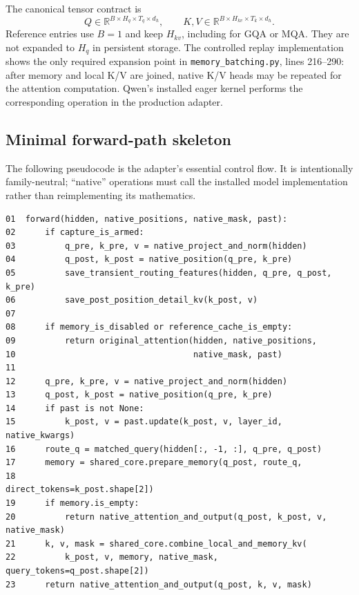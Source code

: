 \documentclass[11pt]{article}
\begin{document}
The canonical tensor contract is
\begin{equation}
Q\in\mathbb{R}^{B\times H_q\times T_q\times d_h},\qquad
K,V\in\mathbb{R}^{B\times H_{kv}\times T_k\times d_h}.
\end{equation}
Reference entries use $B=1$ and keep $H_{kv}$, including for GQA or MQA. They are not expanded
to $H_q$ in persistent storage. The controlled replay implementation shows the only required
expansion point in \texttt{memory\_batching.py}, lines 216--290: after memory and local K/V are
joined, native K/V heads may be repeated for the attention computation. Qwen's installed eager
kernel performs the corresponding operation in the production adapter.

\subsection{Minimal forward-path skeleton}

The following pseudocode is the adapter's essential control flow. It is intentionally
family-neutral; ``native'' operations must call the installed model implementation rather than
reimplementing its mathematics.

\begin{verbatim}
01  forward(hidden, native_positions, native_mask, past):
02      if capture_is_armed:
03          q_pre, k_pre, v = native_project_and_norm(hidden)
04          q_post, k_post = native_position(q_pre, k_pre)
05          save_transient_routing_features(hidden, q_pre, q_post, k_pre)
06          save_post_position_detail_kv(k_post, v)
07
08      if memory_is_disabled or reference_cache_is_empty:
09          return original_attention(hidden, native_positions,
10                                    native_mask, past)
11
12      q_pre, k_pre, v = native_project_and_norm(hidden)
13      q_post, k_post = native_position(q_pre, k_pre)
14      if past is not None:
15          k_post, v = past.update(k_post, v, layer_id, native_kwargs)
16      route_q = matched_query(hidden[:, -1, :], q_pre, q_post)
17      memory = shared_core.prepare_memory(q_post, route_q,
18                                          direct_tokens=k_post.shape[2])
19      if memory.is_empty:
20          return native_attention_and_output(q_post, k_post, v, native_mask)
21      k, v, mask = shared_core.combine_local_and_memory_kv(
22          k_post, v, memory, native_mask, query_tokens=q_post.shape[2])
23      return native_attention_and_output(q_post, k, v, mask)
\end{verbatim}
\end{document}
